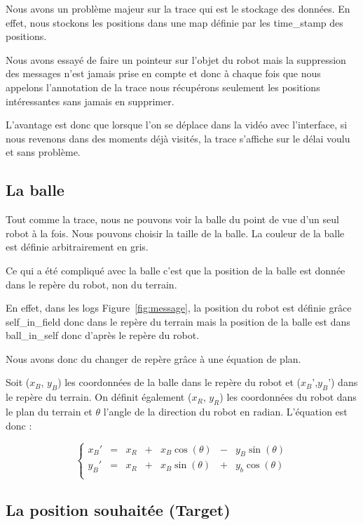 Nous avons un problème majeur sur la trace qui est le stockage des données. En effet, nous stockons les positions dans une map définie par les time\_stamp des positions. 

Nous avons essayé de faire un pointeur sur l'objet du robot mais la suppression des messages n'est jamais prise en compte et donc à chaque fois que nous appelons l'annotation de la trace nous récupérons seulement les positions intéressantes sans jamais en supprimer. 

L'avantage est donc que lorsque l'on se déplace dans la vidéo avec l'interface, si nous revenons dans des moments déjà visités, la trace s'affiche sur le délai voulu et sans problème.

\subsection{La balle}

Tout comme la trace, nous ne pouvons voir la balle du point de vue d'un seul robot à la fois. Nous pouvons choisir la taille de la balle. La couleur de la balle est définie arbitrairement en gris.
\bigskip

Ce qui a été compliqué avec la balle c'est que la position de la balle est donnée dans le repère du robot, non du terrain. 

En effet, dans les logs Figure~\ref{fig:message}, la position du robot est définie grâce self\_in\_field donc dans le repère du terrain mais la position de la balle est dans ball\_in\_self donc d'après le repère du robot.
\bigskip

Nous avons donc du changer de repère grâce à une équation de plan.

Soit ($x_B$, $y_B$) les coordonnées de la balle dans le repère du robot et ($x_B$',$y_B$') dans le repère du terrain. On définit également ($x_R$, $y_R$) les coordonnées du robot dans le plan du terrain et $\theta$ l'angle de la direction du robot en radian. L'équation est donc :

\[\left\{
  \begin{array}{ccccccc}
    x_B'& =& x_R &+& x_B \cos(\theta)& - & y_B \sin(\theta)\\
    y_B' &= & x_R &+& x_B \sin(\theta)& +& y_b \cos(\theta)\\
  \end{array}
\right.
\]    

\subsection{La position souhaitée (Target)}

